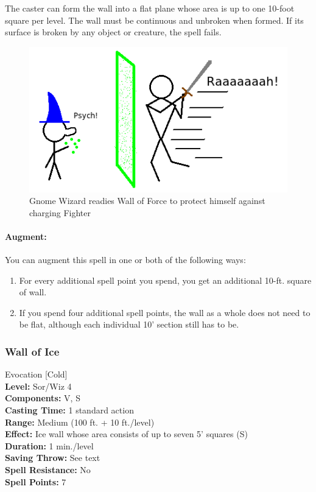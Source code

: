 The caster can form the wall into a flat plane whose area is up to one 10-foot square per level. 
The wall must be continuous and unbroken when formed. If its surface is broken by any object or creature, the spell fails. 

\begin{figure}
  \caption{Gnome Wizard readies Wall of Force to protect himself against charging Fighter}
  \centering
    \includegraphics{Pics/WallOfForce.png}
\end{figure}

\paragraph{Augment:} You can augment this spell in one or both of the following ways:
\begin{enumerate}
 \item For every additional spell point you spend, you get an additional 10-ft. square of wall.
 \item If you spend four additional spell points, the wall as a whole does not need to be flat, although each individual 10' section still has to be.
\end{enumerate}
\subsubsection{Wall of Ice}
\label{Spell:WallOfIce}
Evocation [Cold]
\\ \textbf{Level:} Sor/Wiz 4
\\ \textbf{Components:} V, S
\\ \textbf{Casting Time:} 1 standard action
\\ \textbf{Range:} Medium (100 ft. + 10 ft./level)
\\ \textbf{Effect:} Ice wall whose area consists of up to seven 5' squares (S)
\\ \textbf{Duration:} 1 min./level
\\ \textbf{Saving Throw:} See text
\\ \textbf{Spell Resistance:} No
\\ \textbf{Spell Points:} 7

